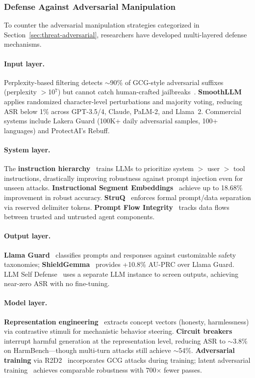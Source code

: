 \subsubsection{Defense Against Adversarial Manipulation}
\label{sec:defense}

To counter the adversarial manipulation strategies categorized in Section~\ref{sec:threat-adversarial}, researchers have developed multi-layered defense mechanisms.

\paragraph{Input layer.}
Perplexity-based filtering detects $\sim$90\% of GCG-style adversarial suffixes (perplexity $>$10$^7$) but cannot catch human-crafted jailbreaks~\cite{alon2023perplexity}. \textbf{SmoothLLM}~\cite{robey2023smoothllm} applies randomized character-level perturbations and majority voting, reducing ASR below 1\% across GPT-3.5/4, Claude, PaLM-2, and Llama~2. Commercial systems include Lakera Guard (100K+ daily adversarial samples, 100+ languages) and ProtectAI's Rebuff.

\paragraph{System layer.}
The \textbf{instruction hierarchy}~\cite{wallace2024hierarchy} trains LLMs to prioritize system $>$ user $>$ tool instructions, drastically improving robustness against prompt injection even for unseen attacks. \textbf{Instructional Segment Embeddings}~\cite{wu2025ise} achieve up to 18.68\% improvement in robust accuracy. \textbf{StruQ}~\cite{chen2025struq} enforces formal prompt/data separation via reserved delimiter tokens. \textbf{Prompt Flow Integrity}~\cite{kim2025pfi} tracks data flows between trusted and untrusted agent components.

\paragraph{Output layer.}
\textbf{Llama Guard}~\cite{inan2023llamaguard} classifies prompts and responses against customizable safety taxonomies; \textbf{ShieldGemma}~\cite{zeng2024shieldgemma} provides +10.8\% AU-PRC over Llama Guard. LLM Self Defense~\cite{phute2023selfdefense} uses a separate LLM instance to screen outputs, achieving near-zero ASR with no fine-tuning.

\paragraph{Model layer.}
\textbf{Representation engineering}~\cite{zou2023repe} extracts concept vectors (honesty, harmlessness) via contrastive stimuli for mechanistic behavior steering. \textbf{Circuit breakers}~\cite{zou2024circuitbreakers} interrupt harmful generation at the representation level, reducing ASR to $\sim$3.8\% on HarmBench---though multi-turn attacks still achieve $\sim$54\%. \textbf{Adversarial training} via R2D2~\cite{mazeika2024harmbench} incorporates GCG attacks during training; latent adversarial training~\cite{sheshadri2024lat} achieves comparable robustness with 700$\times$ fewer passes.

